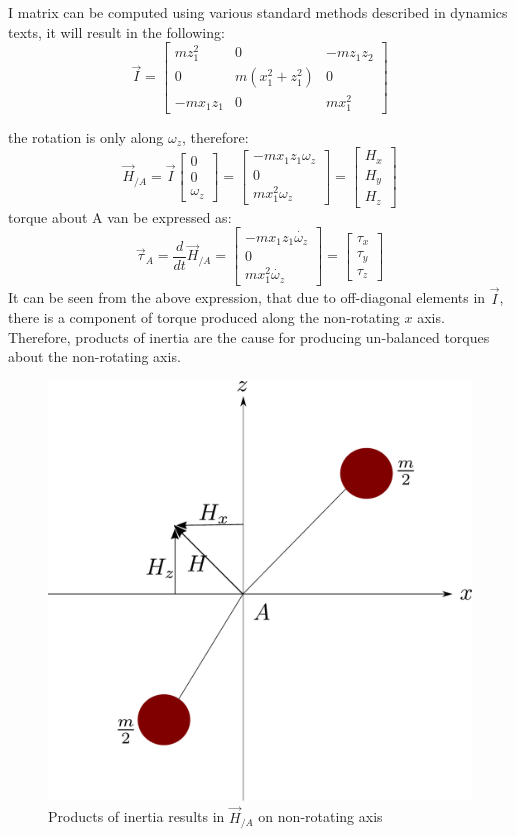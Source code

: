 I matrix can be computed using various standard methods described in dynamics texts, it will result in the following:
\begin{equation}
	\vec{I} = \begin{bmatrix}
		m z_{1}^{2} & 0 & -	m z_{1}z_{2} \\ 0 & m \left( x_{1}^{2} +  z_{1}^{2}\right) & 0 \\
		- m x_{1}z_{1} & 0 & m x_{1}^{2}
	\end{bmatrix}
\end{equation}

the rotation is only along $\omega_{z}$, therefore:
\begin{equation}
	\vec{H}_{/A} = \vec{I} \begin{bmatrix}
		0 \\ 0\\ \omega_{z}
	\end{bmatrix} = \begin{bmatrix}
		-m x_{1} z_{1}\omega_{z} \\ 0 \\ m x_{1}^{2} \omega_{z}
	\end{bmatrix} = \begin{bmatrix}
		H_{x} \\ H_{y} \\ H_{z}
	\end{bmatrix}
\end{equation}
torque about A van be expressed as:
\begin{equation}
	\vec{\tau}_{A} = \frac{d}{dt}\vec{H}_{/A} = \begin{bmatrix}
		-m x_{1} z_{1} \dot{\omega_{z}} \\ 0 \\ m x_{1}^{2} \dot{\omega_{z}}
	\end{bmatrix} = \begin{bmatrix}
		\tau_{x} \\ \tau_{y} \\ \tau_{z} 
	\end{bmatrix}
\end{equation}
It can be seen from the above expression, that due to off-diagonal elements in $\vec{I}$, there is a component of torque produced along the non-rotating $x$ axis. Therefore, products of inertia are the cause for producing un-balanced torques about the non-rotating axis.
\newpage
\begin{figure}[h!]
	\centering
	\includegraphics[width=0.5\linewidth]{Bilder/27_ProdOfInertia_1.pdf}
	\caption{Products of inertia results in $\vec{H}_{/A}$ on non-rotating axis}
	\label{fig_0_ch_5_H_NonRotatingAxis}
\end{figure}
